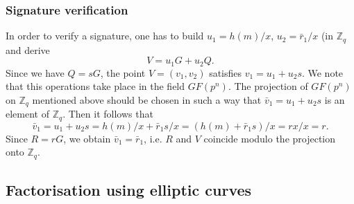 \par
\subsubsection{Signature verification}

In order to verify a signature, one has to build $u_1=h(m)/x$, $u_2=\bar r_1/x$ (in ${\mathbb Z}_q$ and derive
$$ V=u_1G+u_2Q .
$$
Since we have $Q=sG$, the point $V=(v_1,v_2)$ satisfies $v_1=u_1+u_2s$. We note that this operations take place in the field $GF(p^n)$. The projection of $GF(p^n)$ on ${\mathbb Z}_q$ mentioned above should be chosen in such a way that $\bar v_1=u_1+u_2s$ is an element of ${\mathbb Z}_q$. Then it follows that
$$ \bar v_1=u_1+u_2s=h(m)/x+\bar r_1 s/x=(h(m)+\bar r_1s)/x=rx/x=r .
$$
Since $R=rG$, we obtain $\bar v_1=\bar r_1$, i.e. $R$ and $V$ coincide modulo the projection onto ${\mathbb Z}_q$.


\hypertarget{faktell}{}
\subsection{Factorisation using elliptic curves} \label{ECC-Factorisation} 

